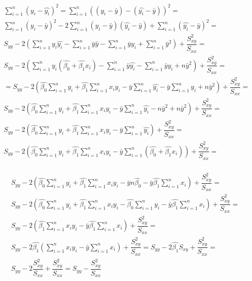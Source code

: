 \documentclass{homework2_template}
\begin{document}
\begin{equation*}
\begin{gathered}
\sum_{i=1}^n (y_i - \hat{y_i})^2 = \sum_{i=1}^n ((y_i - \bar{y}) - (\hat{y_i} - \bar{y}))^2 = \\
\sum_{i=1}^n (y_i - \bar{y})^2 - 2\sum_{i=1}^n (y_i - \bar{y}) (\hat{y_i} - \bar{y}) + \sum_{i=1}^n (\hat{y_i} - \bar{y})^2 = \\
S_{yy} - 2\left(\sum_{i=1}^n y_i\hat{y_i} - \sum_{i=1}^n \bar{y}\hat{y} - \sum_{i=1}^n \bar{y}y_i + \sum_{i=1}^n \bar{y}^2 \right) + \dfrac{S_{xy}^2}{S_{xx}} = \\   
S_{yy} - 2\left(\sum_{i=1}^n y_i(\hat{\beta_0} + \hat{\beta_1}x_i) - \sum_{i=1}^n \bar{y}\hat{y_i} - \sum_{i=1}^n \bar{y}y_i + n\bar{y}^2 \right) + \dfrac{S_{xy}^2}{S_{xx}} = \\
= S_{yy} - 2\left(\hat{\beta_0}\sum_{i=1}^n y_i + \hat{\beta_1}\sum_{i=1}^n x_i y_i - \bar{y}\sum_{i=1}^n\hat{y_i} - \bar{y}\sum_{i=1}^n y_i + n\bar{y}^2 \right) + \dfrac{S_{xy}^2}{S_{xx}} = \\
S_{yy} - 2\left(\hat{\beta_0}\sum_{i=1}^n y_i + \hat{\beta_1}\sum_{i=1}^n x_i y_i - \bar{y}\sum_{i=1}^n\hat{y_i} - n\bar{y}^2 + n\bar{y}^2 \right) + \dfrac{S_{xy}^2}{S_{xx}} = \\
S_{yy} - 2\left(\hat{\beta_0}\sum_{i=1}^n y_i + \hat{\beta_1}\sum_{i=1}^n x_i y_i - \bar{y}\sum_{i=1}^n\hat{y_i} \right) + \dfrac{S_{xy}^2}{S_{xx}} = \\
S_{yy} - 2\left(\hat{\beta_0}\sum_{i=1}^n y_i + \hat{\beta_1}\sum_{i=1}^n x_i y_i - \bar{y}\sum_{i=1}^n (\hat{\beta_0} + \hat{\beta_1}x_i)\right) + \dfrac{S_{xy}^2}{S_{xx}} = \\
\end{gathered}
\end{equation*}

\begin{equation*}
\begin{gathered}
S_{yy} - 2\left(\hat{\beta_0}\sum_{i=1}^n y_i + \hat{\beta_1}\sum_{i=1}^n x_i y_i - \bar{y}n\hat{\beta_0} - \bar{y}\hat{\beta_1}\sum_{i=1}^n x_i\right) + \dfrac{S_{xy}^2}{S_{xx}} = \\
S_{yy} - 2\left(\hat{\beta_0}\sum_{i=1}^n y_i + \hat{\beta_1}\sum_{i=1}^n x_i y_i - \hat{\beta_0}\sum_{i=1}^n y_i - \bar{y}\hat{\beta_1}\sum_{i=1}^n x_i\right) + \dfrac{S_{xy}^2}{S_{xx}} = \\
S_{yy} - 2\left(\hat{\beta_1}\sum_{i=1}^n x_i y_i - \bar{y}\hat{\beta_1}\sum_{i=1}^n x_i\right) + \dfrac{S_{xy}^2}{S_{xx}} = \\
S_{yy} - 2\hat{\beta_1}\left(\sum_{i=1}^n x_i y_i - \bar{y}\sum_{i=1}^n x_i\right) + \dfrac{S_{xy}^2}{S_{xx}} = S_{yy} - 2\hat{\beta_1}S_{xy} + \dfrac{S_{xy}^2}{S_{xx}} = \\
S_{yy} - 2\dfrac{S_{xy}^2}{S_{xx}} + \dfrac{S_{xy}^2}{S_{xx}} = S_{yy} - \dfrac{S_{xy}^2}{S_{xx}}
\end{gathered}
\end{equation*}
\end{document}
